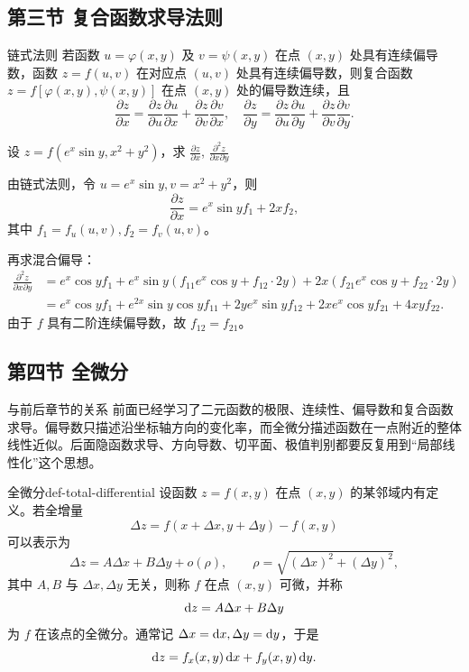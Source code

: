 \subsection{第三节 复合函数求导法则}
\begin{dy}{链式法则}{}
若函数 \( u = \varphi(x,y) \) 及 \( v = \psi(x,y) \) 在点 \( (x,y) \) 处具有连续偏导数，函数 \( z = f(u,v) \) 在对应点 \( (u,v) \) 处具有连续偏导数，则复合函数 \( z = f[\varphi(x,y), \psi(x,y)] \) 在点 \( (x,y) \) 处的偏导数连续，且
\[
\frac{\partial z}{\partial x} = \frac{\partial z}{\partial u}\frac{\partial u}{\partial x} + \frac{\partial z}{\partial v}\frac{\partial v}{\partial x},
\quad
\frac{\partial z}{\partial y} = \frac{\partial z}{\partial u}\frac{\partial u}{\partial y} + \frac{\partial z}{\partial v}\frac{\partial v}{\partial y}.
\]
\end{dy}
\begin{problem}
    设 \( z = f(e^x\sin y, x^2+y^2) \)，求 \( \frac{\partial z}{\partial x} \), \( \frac{\partial^2 z}{\partial x\partial y} \)
\end{problem}
\begin{solution}
    由链式法则，令 \( u = e^x\sin y, v = x^2+y^2 \)，则
\[
\frac{\partial z}{\partial x} = e^x\sin y f_1 + 2x f_2,
\]
其中 \( f_1 = f_u(u,v), f_2 = f_v(u,v) \)。

再求混合偏导：
\[
\begin{aligned}
\frac{\partial^2 z}{\partial x\partial y} &= e^x\cos y f_1 + e^x\sin y\left(f_{11}e^x\cos y + f_{12}\cdot 2y\right) + 2x\left(f_{21}e^x\cos y + f_{22}\cdot 2y\right) \\
&= e^x\cos y f_1 + e^{2x}\sin y\cos y f_{11} + 2ye^x\sin y f_{12} + 2xe^x\cos y f_{21} + 4xy f_{22}.
\end{aligned}
\]
由于 \( f \) 具有二阶连续偏导数，故 \( f_{12} = f_{21} \)。
\end{solution}

\subsection{第四节 全微分}
\begin{summarybox}{与前后章节的关系}
前面已经学习了二元函数的极限、连续性、偏导数和复合函数求导。偏导数只描述沿坐标轴方向的变化率，而全微分描述函数在一点附近的整体线性近似。后面隐函数求导、方向导数、切平面、极值判别都要反复用到“局部线性化”这个思想。
\end{summarybox}

\begin{dy}{全微分}{def-total-differential}
设函数 $z=f(x,y)$ 在点 $(x,y)$ 的某邻域内有定义。若全增量
\[
  \Delta z=f(x+\Delta x,y+\Delta y)-f(x,y)
\]
可以表示为
\[
  \Delta z=A\Delta x+B\Delta y+o(\rho),\qquad
  \rho=\sqrt{(\Delta x)^2+(\Delta y)^2},
\]
其中 $A,B$ 与 $\Delta x,\Delta y$ 无关，则称 $f$ 在点 $(x,y)$ 可微，并称
\[
  \mathop{}\!\mathrm{d} z=A\Delta x+B\Delta y
\]
为 $f$ 在该点的全微分。通常记 $\Delta x=\mathop{}\!\mathrm{d} x,\Delta y=\mathop{}\!\mathrm{d} y$，于是
\[
  \mathop{}\!\mathrm{d} z=f_x(x,y)\mathop{}\!\mathrm{d} x+f_y(x,y)\mathop{}\!\mathrm{d} y.
\]
\end{dy}

